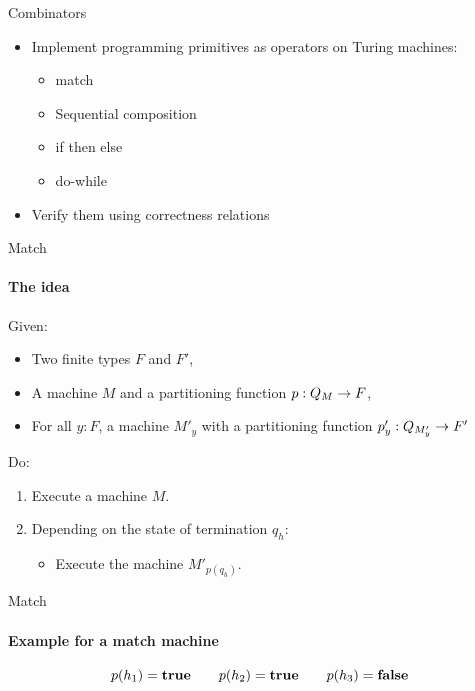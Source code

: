 \begin{frame}{Combinators}
  \begin{itemize}
    \item Implement programming primitives as operators on Turing machines:
    \begin{itemize}
      \item match
      \item Sequential composition
      \item if then else
      \item do-while
    \end{itemize}
  \item Verify them using correctness relations
  \end{itemize}
\end{frame}

\begin{frame}{Match}
  \framesubtitle{The idea}
  Given:
  \begin{itemize}
    \item Two finite types $F$ and $F'$,
    \item A machine $M$ and a partitioning function $p : Q_M \rightarrow F$,
    \item For all $y:F$, a machine $M'_y$ with a partitioning function $p'_y : Q_{M'_y} \rightarrow F'$
  \end{itemize}
  Do:
  \begin{enumerate}
    \item Execute a machine $M$.
    \item Depending on the state of termination $q_h$:
      \begin{itemize}
        \item Execute the machine $M'_{p(q_h)}$.
      \end{itemize}
  \end{enumerate}
\end{frame}


\begin{frame}{Match}
  \framesubtitle{Example for a match machine}
	\vspace{-1cm}
  
  \[
    p(h_1) = \mathbf{true} \qquad p(h_2) = \mathbf{true} \qquad p(h_3) = \mathbf{false}
  \]
\end{frame}

